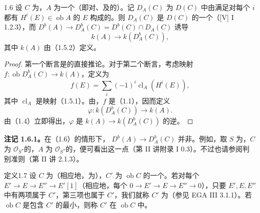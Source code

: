 \begin{SGAresult}{}{1.6}
设 $C$ 为，$A$ 为一个（即对、及的）。记 $D_A(C)$ 为 $D(C)$ 中由满足对每个 $i$ 都有 $H^i(E)\in\operatorname{ob}A$ 的 $E$ 构成的。则 $D_A(C)$ 是 $D(C)$ 的一个（[V] I 1.2.3），而 $D^b(A)\to D_A^b(C)=D^b(C)\cap D_A(C)$ 诱导
\[k(A)\longrightarrow k(D_A^b(C)),\]
其中 $k(A)$ 由（1.5.2）定义。
\end{SGAresult}
\begin{proof}
第一个断言是的直接推论。对于第二个断言，考虑映射 $f:\operatorname{ob}D_A^b(C)\to k(A)$，定义为
\[f(E)=\sum_i(-1)^i\operatorname{cl}_A(H^i(E)),\]
其中 $\operatorname{cl}_A$ 是映射（1.5.1）。由，$f$ 是（1.1），因而定义
\[\varphi:k(D_A^b(C))\longrightarrow k(A).\]
由（1.4）立即得出，$\varphi$ 是 $k(A)\to k(D_A^b(C))$ 的逆。
\end{proof}

\textbf{注记 1.6.1。}在（1.6）的情形下， $D^b(A)\to D_A^b(C)$ 并非。例如，取 $S$ 为，$C$ 为 $\mathscr O_S$-的，$A$ 为 $\mathscr O_S$-的，便可看出这一点（第 II 讲附录 I 0.3）。不过也请参阅判别准则（第 II 讲 2.1.3）。

\begin{SGAresult}{定义}{1.7}
设 $C$ 为（相应地，为），$C'$ 为 $\operatorname{ob}C$ 的一个。若对每个 $E'\to E\to E''\to E'[1]$（相应地，每个 $0\to E'\to E\to E''\to0$），只要 $E',E,E''$ 中有两项属于 $C'$，第三项也属于 $C'$，我们就称 $C'$ 为（参见 EGA III 3.1.1）。若 $\operatorname{ob}C$ 是包含 $C'$ 的最小，则称 $C'$ 在 $\operatorname{ob}C$ 中。
\end{SGAresult}

